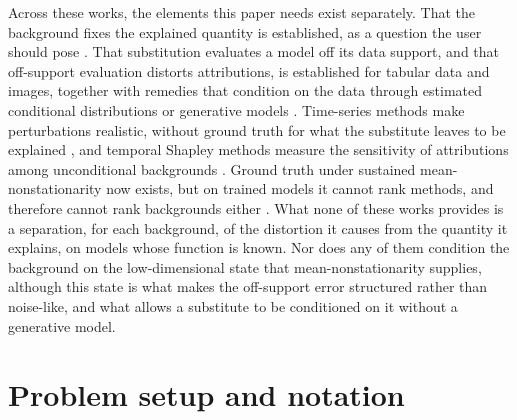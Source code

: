 \documentclass{article}
\begin{document}
Across these works, the elements this paper needs exist separately. That the background fixes the explained quantity is established, as a question the user should pose \citep{merrick2020explanation, mamalakis2023carefully}. That substitution evaluates a model off its data support, and that off-support evaluation distorts attributions, is established for tabular data and images, together with remedies that condition on the data through estimated conditional distributions or generative models \citep{frye2021shapley, aas2021explaining, chang2019explaining}. Time-series methods make perturbations realistic, without ground truth for what the substitute leaves to be explained \citep{tonekaboni2020went, liu2024explaining, kim2026deltaxai}, and temporal Shapley methods measure the sensitivity of attributions among unconditional backgrounds \citep{kim2026groupsegment, papadeas2026empirical}. Ground truth under sustained mean-nonstationarity now exists, but on trained models it cannot rank methods, and therefore cannot rank backgrounds either \citep{degradx2026}. What none of these works provides is a separation, for each background, of the distortion it causes from the quantity it explains, on models whose function is known. Nor does any of them condition the background on the low-dimensional state that mean-nonstationarity supplies, although this state is what makes the off-support error structured rather than noise-like, and what allows a substitute to be conditioned on it without a generative model.


\section{Problem setup and notation}
\label{sec:setup}
\end{document}
